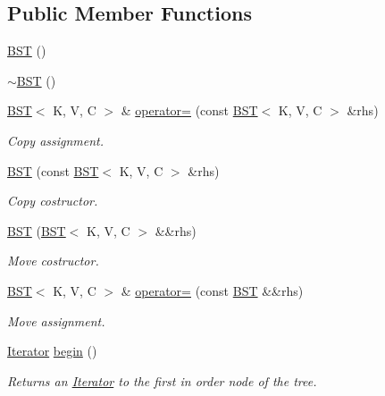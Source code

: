 \subsection*{Public Member Functions}
\begin{DoxyCompactItemize}
\item 
\hyperlink{classBST_a3cba9e816367006087a999b5e1027d72}{B\+ST} ()
\item 
\hyperlink{classBST_a77d30398500d92fe8a906c72677eaafb}{$\sim$\+B\+ST} ()
\item 
\hyperlink{classBST}{B\+ST}$<$ K, V, C $>$ \& \hyperlink{classBST_a59e6c0bc7ce4ad71686ae26ca3f71d77}{operator=} (const \hyperlink{classBST}{B\+ST}$<$ K, V, C $>$ \&rhs)
\begin{DoxyCompactList}\small\item\em Copy assignment. \end{DoxyCompactList}\item 
\hyperlink{classBST_a447d9506675de51dbf56403fa2b910e8}{B\+ST} (const \hyperlink{classBST}{B\+ST}$<$ K, V, C $>$ \&rhs)
\begin{DoxyCompactList}\small\item\em Copy costructor. \end{DoxyCompactList}\item 
\hyperlink{classBST_af590b11504c8725c0c0b983ccda10517}{B\+ST} (\hyperlink{classBST}{B\+ST}$<$ K, V, C $>$ \&\&rhs)
\begin{DoxyCompactList}\small\item\em Move costructor. \end{DoxyCompactList}\item 
\hyperlink{classBST}{B\+ST}$<$ K, V, C $>$ \& \hyperlink{classBST_a487925834a1291eec64d6efac4fb9fab}{operator=} (const \hyperlink{classBST}{B\+ST} \&\&rhs)
\begin{DoxyCompactList}\small\item\em Move assignment. \end{DoxyCompactList}\item 
\mbox{\label{classBST_a28d4d73ccb420ad1e0dbd36bc5252d74}} 
\hyperlink{classBST_1_1Iterator}{Iterator} \hyperlink{classBST_a28d4d73ccb420ad1e0dbd36bc5252d74}{begin} ()
\begin{DoxyCompactList}\small\item\em Returns an \hyperlink{classBST_1_1Iterator}{Iterator} to the first in order node of the tree. \end{DoxyCompactList}\item 

\end{DoxyCompactItemize}
